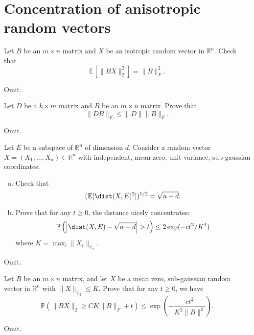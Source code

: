 \section{Concentration of anisotropic random vectors}
\begin{problem*}[Exercise 6.3.1]\label{ex6.3.1}
	Let \(B\) be an \(m \times n\) matrix and \(X\) be an isotropic random vector in \(\mathbb{R} ^n\). Check that
	\[
		\mathbb{E}_{}[\lVert BX \rVert _2^2]
		= \lVert B \rVert _F^2.
	\]
\end{problem*}
\begin{answer}
	Omit.
\end{answer}

\begin{problem*}[Exercise 6.3.3]\label{ex6.3.3}
	Let \(D\) be a \(k \times m\) matrix and \(B\) be an \(m \times n\) matrix. Prove that
	\[
		\lVert DB \rVert _F
		\leq \lVert D \rVert \lVert B \rVert _F.
	\]
\end{problem*}
\begin{answer}
	Omit.
\end{answer}

\begin{problem*}[Exercise 6.3.4]\label{ex6.3.4}
	Let \(E\) be a subspace of \(\mathbb{R} ^n\) of dimension \(d\). Consider a random vector \(X = (X_1, \dots , X_n) \in \mathbb{R} ^n\) with independent, mean zero, unit variance, sub-gaussian coordinates.
	\begin{enumerate}[(a)]
		\item\label{ex6.3.4:a} Check that
		      \[
			      (\mathbb{E}_{}[\dist(X, E)^2] )^{1 / 2}
			      = \sqrt{n - d} .
		      \]
		\item\label{ex6.3.4:b} Prove that for any \(t \geq 0\), the distance nicely concentrates:
		      \[
			      \mathbb{P} \left( \left\lvert \dist(X, E) - \sqrt{n - d} \right\rvert > t \right)
			      \leq 2 \exp (-ct^2 / K^4)
		      \]
		      where \(K = \max _i \lVert X_i \rVert _{\psi _2}\).
	\end{enumerate}
\end{problem*}
\begin{answer}
	Omit.
\end{answer}

\begin{problem*}[Exercise 6.3.5]\label{ex6.3.5}
	Let \(B\) be an \(m \times n\) matrix, and let \(X\) be a mean zero, sub-gaussian random vector in \(\mathbb{R} ^n\) with \(\lVert X \rVert _{\psi _2} \leq K\). Prove that for any \(t \geq 0\), we have
	\[
		\mathbb{P} ( \lVert BX \rVert _2 \geq CK \lVert B \rVert _F + t)
		\leq \exp (- \frac{ct^2}{K^2 \lVert B \rVert ^2}).
	\]
\end{problem*}
\begin{answer}
	Omit.
\end{answer}

